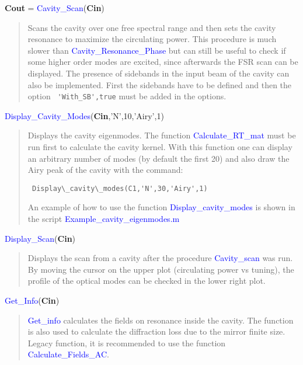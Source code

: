 \noindent \textbf{Cout} = \textcolor{blue}{Cavity\_Scan}(\textbf{Cin})
\vspace*{-0.2cm}
\begin{quote}
Scans the cavity over one free spectral range and then sets the cavity resonance to maximize the circulating power. This procedure is much slower than \textcolor{blue}{Cavity\_Resonance\_Phase} but can still be useful to check if some higher order modes are excited, since afterwards the FSR scan can be displayed.
The presence of sidebands in the input beam of the cavity can also be implemented. First the sidebands have to be defined and then the option \verb? 'With_SB',true? must be added in the options.


\end{quote}

\noindent \textcolor{blue}{Display\_Cavity\_Modes}(\textbf{Cin},'N',10,'Airy',1)
\vspace*{-0.2cm}
\begin{quote}
Displays the cavity eigenmodes. The function \textcolor{blue}{Calculate\_RT\_mat} must be run first to calculate the cavity kernel. With this function one can display an arbitrary number of modes (by default the first 20) and also draw the Airy peak of the cavity with the command:

  \verb? Display\_cavity\_modes(C1,'N',30,'Airy',1) ?

An example of how to use the function \textcolor{blue}{Display\_cavity\_modes} is shown in the script \textcolor{blue}{Example\_cavity\_eigenmodes.m}
\end{quote}

\noindent \textcolor{blue}{Display\_Scan}(\textbf{Cin})
\vspace*{-0.2cm}
\begin{quote}
Displays the scan from a cavity after the procedure \textcolor{blue}{Cavity\_scan} was run. By moving the cursor on the upper plot (circulating power vs tuning), the profile of the optical modes can be checked in the lower right plot.
\end{quote}

\noindent \textcolor{blue}{Get\_Info}(\textbf{Cin})
\vspace*{-0.2cm}
\begin{quote}
\textcolor{blue}{Get\_info} calculates the fields on resonance inside the cavity. The function is also used to calculate the diffraction loss due to the mirror finite size. Legacy function, it is recommended to use the function \textcolor{blue}{Calculate\_Fields\_AC}.
\end{quote}



